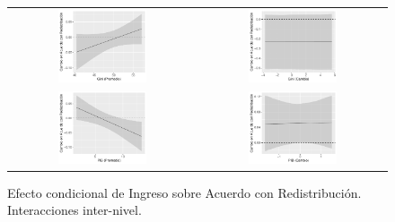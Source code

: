 \documentclass[12pt,letterpaper]{article}
\begin{document}
\begin{figure}[H]
	\centering
	\begin{tabular}{cc}
		\includegraphics[width=0.49\textwidth]{MarGINI1.pdf} & 
		\includegraphics[width=0.49\textwidth]{MarGINI2.pdf} \\
		\includegraphics[width=0.49\textwidth]{MarPIB1.pdf} & 
		\includegraphics[width=0.49\textwidth]{MarPIB2.pdf} 
	\end{tabular}
	\caption{Efecto condicional de Ingreso sobre Acuerdo con Redistribución. Interacciones inter-nivel.}
	\label{fig:interac}
\end{figure}
\end{document}
